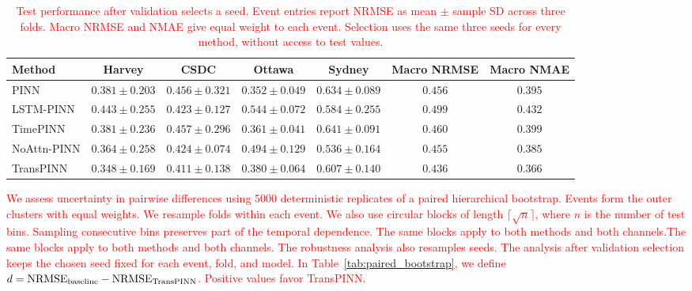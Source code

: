 \documentclass[letterpaper,journal]{IEEEtran}
\begin{document}
\begin{table}[t]
	\caption{\textcolor{red}{Test performance after validation selects a seed. Event entries report NRMSE as mean $\pm$ sample SD across three folds. Macro NRMSE and NMAE give equal weight to each event. Selection uses the same three seeds for every method, without access to test values.}}
	\label{tab:validation_selected}
	\centering\scriptsize
	\setlength{\tabcolsep}{3.2pt}
	\begin{tabular}{@{}lcccccc@{}}
	\toprule
	Method & Harvey & CSDC & Ottawa & Sydney & Macro NRMSE & Macro NMAE\\
	\midrule
	PINN & $0.381\!\pm\!0.203$ & $0.456\!\pm\!0.321$ & $\mathbf{0.352\!\pm\!0.049}$ & $0.634\!\pm\!0.089$ & $0.456$ & $0.395$\\
	LSTM-PINN & $0.443\!\pm\!0.255$ & $0.423\!\pm\!0.127$ & $0.544\!\pm\!0.072$ & $0.584\!\pm\!0.255$ & $0.499$ & $0.432$\\
	TimePINN & $0.381\!\pm\!0.236$ & $0.457\!\pm\!0.296$ & $0.361\!\pm\!0.041$ & $0.641\!\pm\!0.091$ & $0.460$ & $0.399$\\
	NoAttn-PINN & $0.364\!\pm\!0.258$ & $0.424\!\pm\!0.074$ & $0.494\!\pm\!0.129$ & $\mathbf{0.536\!\pm\!0.164}$ & $0.455$ & $0.385$\\
	TransPINN & $\mathbf{0.348\!\pm\!0.169}$ & $\mathbf{0.411\!\pm\!0.138}$ & $0.380\!\pm\!0.064$ & $0.607\!\pm\!0.140$ & $\mathbf{0.436}$ & $\mathbf{0.366}$\\
	\bottomrule
	\end{tabular}
\end{table}



\textcolor{red}{
We assess uncertainty in pairwise differences using 5000 deterministic replicates of a paired hierarchical bootstrap. Events form the outer clusters with equal weights. We resample folds within each event. We also use circular blocks of length $\lceil\sqrt{n}\rceil$, where $n$ is the number of test bins. Sampling consecutive bins preserves part of the temporal dependence. The same blocks apply to both methods and both channels.The same blocks apply to both methods and both channels.
The robustness analysis also resamples seeds. The analysis after validation selection keeps the chosen seed fixed for each event, fold, and model. In Table~\ref{tab:paired_bootstrap}, we define $d={\rm NRMSE}_{\rm baseline}-{\rm NRMSE}_{\rm TransPINN}$. Positive values favor TransPINN.
}
\end{document}
